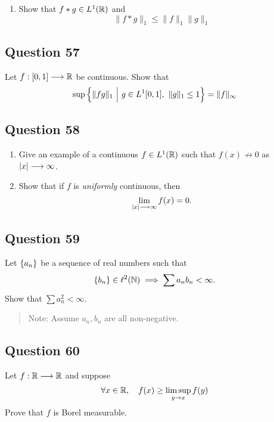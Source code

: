 \documentclass[12pt]{article}
\providecommand{\tightlist}{%
  \setlength{\itemsep}{0pt}\setlength{\parskip}{0pt}}
\begin{document}
\begin{enumerate}
\def\labelenumi{\arabic{enumi}.}
\setcounter{enumi}{1}
\tightlist
\item
  Show that \(f\ast g \in L^1({\mathbb{R}})\) and \[
  \|f * g\|_{1} \leq\|f\|_{1}\|g\|_{1}
  \]
\end{enumerate}

\hypertarget{question-57-1}{%
\subsection{Question 57}\label{question-57-1}}

Let \(f: [0, 1] \longrightarrow {\mathbb{R}}\) be continuous. Show that \[
\sup \left\{\|f g\|_{1} {~\mathrel{\Big|}~} g \in L^{1}[0,1],~~ \|g\|_{1} \leq 1\right\}=\|f\|_{\infty}
\]

\hypertarget{question-58-1}{%
\subsection{Question 58}\label{question-58-1}}

\begin{enumerate}
\def\labelenumi{\arabic{enumi}.}
\item
  Give an example of a continuous \(f\in L^1({\mathbb{R}})\) such that
  \(f(x) \not\to 0\) as\({\left\lvert {x} \right\rvert} \longrightarrow \infty\).
\item
  Show that if \(f\) is \emph{uniformly} continuous, then \[
  \lim_{{\left\lvert {x} \right\rvert} \longrightarrow \infty} f(x) = 0.
  \]
\end{enumerate}

\hypertarget{question-59-1}{%
\subsection{Question 59}\label{question-59-1}}

Let \(\left\{{a_n}\right\}\) be a sequence of real numbers such that \[
\left\{{b_n}\right\} \in \ell^2({\mathbb{N}}) \implies \sum a_n b_n < \infty.
\] Show that \(\sum a_n^2 < \infty\).

\begin{quote}
Note: Assume \(a_n, b_n\) are all non-negative.
\end{quote}

\hypertarget{question-60-1}{%
\subsection{Question 60}\label{question-60-1}}

Let \(f: {\mathbb{R}} \longrightarrow {\mathbb{R}}\) and suppose \[
\forall x\in {\mathbb{R}},\quad f(x) \geq \limsup _{y \rightarrow x} f(y)
\] Prove that \(f\) is Borel measurable.
\end{document}
